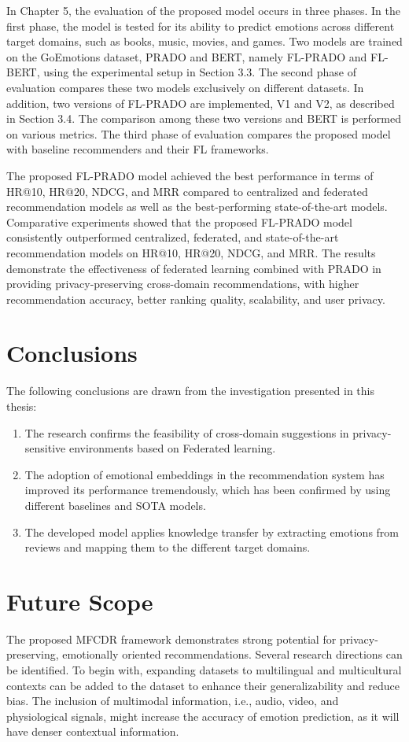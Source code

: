 In Chapter 5, the evaluation of the proposed model occurs in three phases. In the first phase, the model is tested for its ability to predict emotions across different target domains, such as books, music, movies, and games. Two models are trained on the GoEmotions dataset, PRADO and BERT, namely FL-PRADO and FL-BERT, using the experimental setup in Section 3.3. The second phase of evaluation compares these two models exclusively on different datasets. In addition, two versions of FL-PRADO are implemented, V1 and V2, as described in Section 3.4. The comparison among these two versions and BERT is performed on various metrics. The third phase of evaluation compares the proposed model with baseline recommenders and their FL frameworks.

The proposed FL-PRADO model achieved the best performance in terms of HR@10, HR@20, NDCG, and MRR compared to centralized and federated recommendation models as well as the best-performing state-of-the-art models. Comparative experiments showed that the proposed FL-PRADO model consistently outperformed centralized, federated, and state-of-the-art recommendation models on HR@10, HR@20, NDCG, and MRR. The results demonstrate the effectiveness of federated learning combined with PRADO in providing privacy-preserving cross-domain recommendations, with higher recommendation accuracy, better ranking quality, scalability, and user privacy.

\section{Conclusions}
The following conclusions are drawn from the investigation presented in this thesis:

\begin{enumerate}
  \item The research confirms the feasibility of cross-domain suggestions in privacy-sensitive environments based on Federated learning.
  \item The adoption of emotional embeddings in the recommendation system has improved its performance tremendously, which has been confirmed by using different baselines and SOTA models.
  \item The developed model applies knowledge transfer by extracting emotions from reviews and mapping them to the different target domains.
\end{enumerate}

\section{Future Scope}
The proposed MFCDR framework demonstrates strong potential for privacy-preserving, emotionally oriented recommendations. Several research directions can be identified. To begin with, expanding datasets to multilingual and multicultural contexts can be added to the dataset to enhance their generalizability and reduce bias. The inclusion of multimodal information, i.e., audio, video, and physiological signals, might increase the accuracy of emotion prediction, as it will have denser contextual information.

